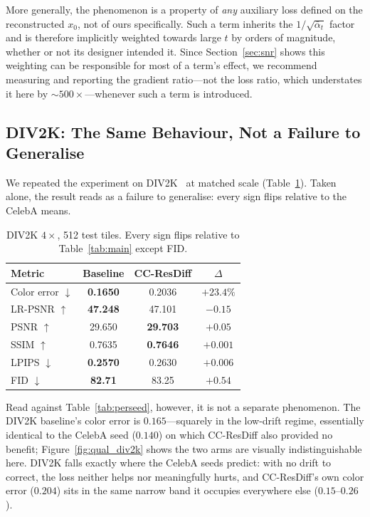 \documentclass[11pt]{article}
\newcommand{\best}[1]{\textbf{#1}}
\begin{document}
More generally, the phenomenon is a property of \emph{any} auxiliary loss defined
on the reconstructed $x_0$, not of ours specifically. Such a term inherits the
$1/\sqrt{\bar\alpha_t}$ factor and is therefore implicitly weighted towards large
$t$ by orders of magnitude, whether or not its designer intended it. Since
Section~\ref{sec:snr} shows this weighting can be responsible for most of a
term's effect, we recommend measuring and reporting the gradient ratio---not the
loss ratio, which understates it here by ${\sim}500\times$---whenever such a term
is introduced.

\subsection{DIV2K: The Same Behaviour, Not a Failure to Generalise}

We repeated the experiment on DIV2K~\cite{agustsson2017ntire} at matched scale (Table~\ref{tab:div2k}).
Taken alone, the result reads as a failure to generalise: every sign flips
relative to the CelebA means.

\begin{table}[t]
\centering
\small
\begin{tabular}{lccc}
\toprule
Metric & Baseline & CC-ResDiff & $\Delta$ \\
\midrule
Color error $\downarrow$ & \best{0.1650} & 0.2036 & $+23.4\%$ \\
LR-PSNR $\uparrow$       & \best{47.248} & 47.101 & $-0.15$ \\
PSNR $\uparrow$          & 29.650 & \best{29.703} & $+0.05$ \\
SSIM $\uparrow$          & 0.7635 & \best{0.7646} & $+0.001$ \\
LPIPS $\downarrow$       & \best{0.2570} & 0.2630 & $+0.006$ \\
FID $\downarrow$         & \best{82.71} & 83.25 & $+0.54$ \\
\bottomrule
\end{tabular}
\caption{DIV2K $4\times$, 512 test tiles. Every sign flips relative to
Table~\ref{tab:main} except FID.}
\label{tab:div2k}
\end{table}

Read against Table~\ref{tab:perseed}, however, it is not a separate phenomenon.
The DIV2K baseline's color error is $0.165$---squarely in the low-drift regime,
essentially identical to the CelebA seed ($0.140$) on which CC-ResDiff also
provided no benefit; Figure~\ref{fig:qual_div2k} shows the two arms are
visually indistinguishable here. DIV2K falls exactly where the CelebA seeds predict: with no
drift to correct, the loss neither helps nor meaningfully hurts, and CC-ResDiff's
own color error ($0.204$) sits in the same narrow band it occupies everywhere
else ($0.15$--$0.26$).
\end{document}
